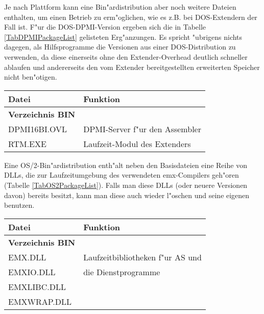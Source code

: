 \documentclass[12pt,a4paper,twoside]{report}
\begin{document}
Je nach Plattform kann eine Bin"ardistribution aber noch weitere Dateien
enthalten, um einen Betrieb zu erm"oglichen, wie es z.B. bei DOS-Extendern
der Fall ist.  F"ur die DOS-DPMI-Version  ergeben
sich die in Tabelle \ref{TabDPMIPackageList} gelisteten Erg"anzungen.  Es
spricht "ubrigens nichts dagegen, als Hilfsprogramme die Versionen aus
einer DOS-Distribution zu verwenden, da diese einerseits ohne den
Extender-Overhead deutlich schneller ablaufen und andererseits den
vom Extender bereitgestellten erweiterten Speicher nicht ben"otigen.

\begin{table*}[htp]
\begin{center}\begin{tabular}{|l|l|}
\hline
Datei             & Funktion \\
\hline
\hline
{\bf Verzeichnis BIN} & \\
\hline
DPMI16BI.OVL   & DPMI-Server f"ur den Assembler \\
RTM.EXE        & Laufzeit-Modul des Extenders \\
\hline
\end{tabular}\end{center}
\caption{Zus"atzliche Dateien in einer DPMI-Bin"ardistribution
         \label{TabDPMIPackageList}}
\end{table*}

Eine OS/2-Bin"ardistribution  enth"alt neben den
Basisdateien eine Reihe von DLLs, die zur Laufzeitumgebung des verwendeten
emx-Compilers geh"oren (Tabelle \ref{TabOS2PackageList}).  Falls man diese
DLLs (oder neuere Versionen davon) bereits besitzt, kann man diese auch
wieder l"oschen und seine eigenen benutzen.

\begin{table*}[htp]
\begin{center}\begin{tabular}{|l|l|}
\hline
Datei             & Funktion \\
\hline
\hline
{\bf Verzeichnis BIN} & \\
\hline
EMX.DLL           & Laufzeitbibliotheken f"ur AS und \\
EMXIO.DLL         & die Dienstprogramme \\
EMXLIBC.DLL       & \\
EMXWRAP.DLL       & \\
\hline
\end{tabular}\end{center}
\caption{Zus"atzliche Dateien in einer OS/2-Bin"ardistribution
         \label{TabOS2PackageList}}
\end{table*}
\end{document}
